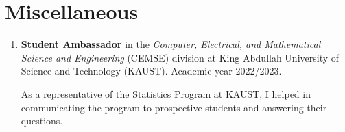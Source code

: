 \documentclass[10pt, ]{article}
\begin{document}
	\vspace{10pt}

	\vspace{-12pt}
	\section*{Miscellaneous} \vspace{-5pt}
	
	\begin{enumerate}[noitemsep, topsep=0pt]
		\item \textbf{Student Ambassador} in the\textit{ Computer, Electrical,  and Mathematical Science and Engineering} (CEMSE) division at King Abdullah University of Science and Technology (KAUST). Academic year 2022/2023.
		
		As a representative of the Statistics Program at KAUST, I helped in communicating the program to prospective students and answering their questions.
	\end{enumerate}
	
\end{document}
